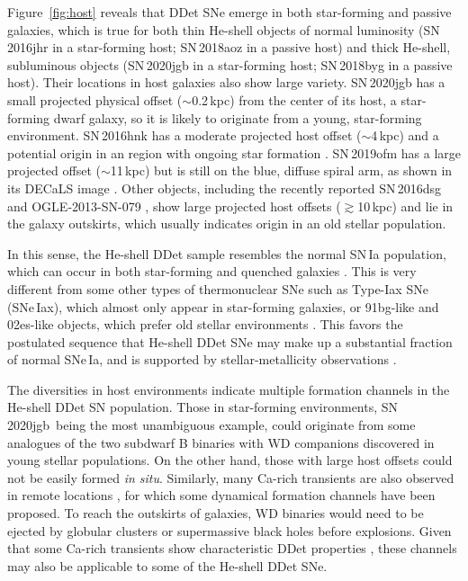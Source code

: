 \documentclass[twocolumn]{aastex631}
\newcommand{\sn}{SN\,2020jgb}
\newcommand{\adam}[1]{\textcolor{red}{[AAM: #1]}}
\newcommand{\chang}[1]{\textcolor{blue}{[Chang: #1]}}
\begin{document}
Figure~\ref{fig:host} reveals that DDet SNe emerge in both star-forming and passive galaxies, which is true for both thin He-shell objects of normal luminosity (SN\,2016jhr in a star-forming host; SN\,2018aoz in a passive host) and thick He-shell, subluminous objects (SN\,2020jgb in a star-forming host; SN\,2018byg in a passive host). Their locations in host galaxies also show large variety. SN\,2020jgb has a small projected physical offset ($\sim$0.2\,kpc) from the center of its host, a star-forming dwarf galaxy, so it is likely to originate from a young, star-forming environment. SN\,2016hnk has a moderate projected host offset ($\sim$4\,kpc) and a potential origin in an  region with ongoing star formation \citep{galbany_16hnk_2019}. SN\,2019ofm has a large projected offset ($\sim$11\,kpc) but is still on the blue, diffuse spiral arm, as shown in its DECaLS image \citep{Dey_2019}. Other objects, including the recently reported SN\,2016dsg and OGLE-2013-SN-079 \citep{Dong_16dsg_2022}, show large projected host offsets ($\gtrsim$10\,kpc) and lie in the galaxy outskirts, which usually indicates origin in an old stellar population.

In this sense, the He-shell DDet sample resembles the normal SN\,Ia population, which can occur in both star-forming and quenched galaxies \citep[e.g.,][]{Sullivan_2006, Smith_2012}. This is very different from some other types of thermonuclear SNe such as Type-Iax SNe (SNe\,Iax), which almost only appear in star-forming galaxies, or 91bg-like and 02es-like \citep{Ganeshalingam_2012} objects, which prefer old stellar environments \citep[see the review by][]{Jha_2019}. This favors the postulated sequence that He-shell DDet SNe may make up a substantial fraction of normal SNe\,Ia, and is supported by stellar-metallicity observations \citep{Sanders_2021, Eitner_2022}.

The diversities in host environments indicate multiple formation channels in the He-shell DDet SN population. Those in star-forming environments, \sn\ being the most unambiguous example, could originate from some analogues of the two subdwarf B binaries with WD companions \citep{Geier_2013, Kupfer_2022} discovered in young stellar populations.
On the other hand, those with large host offsets could not be easily formed {\it in situ}. Similarly, many Ca-rich transients are also observed in remote locations \citep{Lunnan_2017}, for which some dynamical formation channels have been proposed. To reach the outskirts of galaxies, WD binaries would need to be ejected by globular clusters \citep{Shen_2019} or supermassive black holes \citep{Foley_2015} before explosions. Given that some Ca-rich transients show characteristic DDet properties \citep{de_Ca_rich_2020}, these channels may also be applicable to some of the He-shell DDet SNe. 
\end{document}
